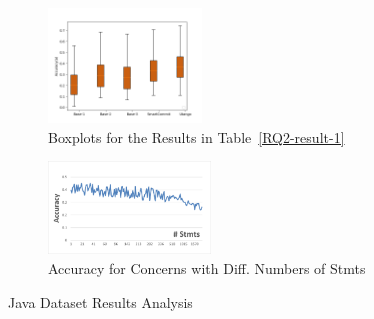 \begin{figure}
	\centering
	\begin{subfigure}{0.235\textwidth}
	\centering
	\includegraphics[width=1.6in]{figures/RQ_2_1.png}
	\vspace{-8pt}
	\caption{Boxplots for the Results in Table~\ref{RQ2-result-1}}
	\label{RQ2-result-2}
	\end{subfigure}
\hfill
	\begin{subfigure}{0.225\textwidth}
		\centering
		\includegraphics[width=1.7in]{figures/accuracy-concerns-java.png}
		\vspace{-8pt}
		\caption{Accuracy for Concerns with Diff. Numbers of Stmts}
		\label{RQ2-result-3}
	\end{subfigure}
	\label{RQ2-result-4}
	\vspace{-12pt}
	\caption{Java Dataset Results Analysis}
\end{figure}

{\color{red}{ 1--22 changed statements: 37\%--45\%. Lowest: 24\%
	
100\% correct: \tool: 116, SmartCommit: 109, Overlapping: 21}}